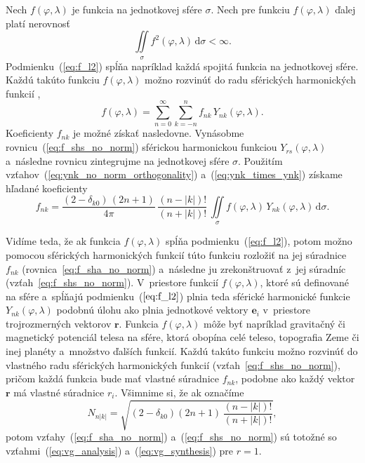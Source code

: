\documentclass[a4paper,12pt]{book}
\newcommand{\diff}{\mathrm d}
\let\vec\mathbf
\begin{document}
Nech $f(\varphi, \lambda)$ je funkcia na jednotkovej sfére $\sigma$.  Nech pre
funkciu $f(\varphi, \lambda)$ ďalej platí nerovnosť
%
\begin{equation}
\label{eq:f_l2}
\iint\limits_\sigma f^2(\varphi, \lambda) \, \diff \sigma < \infty{.}
\end{equation}
%
Podmienku~(\ref{eq:f_l2}) spĺňa napríklad každá spojitá funkcia na jednotkovej
sfére.  Každú takúto funkciu $f(\varphi, \lambda)$ možno rozvinúť do radu
sférických harmonických funkcií \parencite[napríklad][]{MoritzPhysicalGeodesy},
%
\begin{equation}
\label{eq:f_shs_no_norm}
f(\varphi, \lambda) = \sum_{n = 0}^\infty \sum_{k = -n}^n f_{nk} \,
Y_{nk}(\varphi, \lambda){.}
\end{equation}
%
Koeficienty $f_{nk}$ je možné získať nasledovne.  Vynásobme 
rovnicu~(\ref{eq:f_shs_no_norm}) sférickou harmonickou funkciou 
$Y_{rs}(\varphi, \lambda)$ a~následne rovnicu zintegrujme na jednotkovej sfére 
$\sigma$.  Použitím vzťahov~(\ref{eq:ynk_no_norm_orthogonality}) 
a~(\ref{eq:ynk_times_ynk}) získame hľadané koeficienty
%
\begin{equation}
\label{eq:f_sha_no_norm}
f_{nk} = \frac{(2 - \delta_{k0}) \, (2n + 1)}{4\pi} \, \frac{(n - |k|)!}{(n 
+ |k|)!} \, \iint\limits_{\sigma} f(\varphi, \lambda) \, Y_{nk}(\varphi, 
\lambda) \, \diff \sigma{.}
\end{equation}
%

Vidíme teda, že ak funkcia $f(\varphi, \lambda)$ spĺňa
podmienku~(\ref{eq:f_l2}), potom možno pomocou sférických harmonických funkcií
túto funkciu rozložiť na jej súradnice $f_{nk}$
(rovnica~\ref{eq:f_sha_no_norm}) a~následne ju zrekonštruovať z~jej súradníc
(vzťah~\ref{eq:f_shs_no_norm}).  V~priestore funkcií $f(\varphi, \lambda)$,
ktoré sú definované na sfére a~spĺňajú podmienku~($\ref{eq:f_l2}$) plnia teda
sférické harmonické funkcie $Y_{nk}(\varphi, \lambda)$ podobnú úlohu ako plnia
jednotkové vektory $\vec e_i$ v~priestore trojrozmerných vektorov $\vec r$.
Funkcia $f(\varphi,\lambda)$ môže byť napríklad gravitačný či magnetický
potenciál telesa na sfére, ktorá obopína celé teleso, topografia Zeme či inej
planéty a~množstvo ďalších funkcií.  Každú takúto funkciu možno rozvinúť do
vlastného radu sférických harmonických funkcií (vzťah~\ref{eq:f_shs_no_norm}),
pričom každá funkcia bude mať vlastné súradnice $f_{nk}$, podobne ako každý
vektor $\vec r$ má vlastné súradnice $r_i$.  Všimnime si, že ak označíme
%
\begin{equation}
\label{eq:sh_norm}
N_{n|k|} = \sqrt{(2 - \delta_{k0}) (2n + 1) \, \frac{(n - |k|)!}{(n
+ |k|)!}}{,}
\end{equation}
%
potom vzťahy~(\ref{eq:f_sha_no_norm}) a~(\ref{eq:f_shs_no_norm}) sú totožné so
vzťahmi~(\ref{eq:vg_analysis}) a~(\ref{eq:vg_synthesis}) pre $r = 1$.
\end{document}
